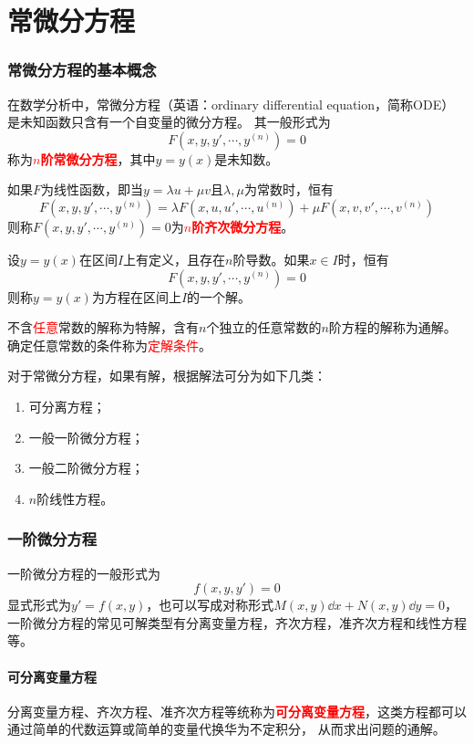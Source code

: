 \part{常微分方程}

\section{常微分方程的基本概念}
在数学分析中，常微分方程（英语：ordinary differential equation，简称ODE）是未知函数只含有一个自变量的微分方程。
其一般形式为
\begin{equation}
    F\left(x,y,y',\cdots,y^{(n)}\right) = 0
\end{equation}
称为\textcolor{red}{\textbf{\textsf{$n$阶常微分方程}}}，其中$y=y(x)$是未知数。

如果$F$为线性函数，即当$y=\lambda u + \mu v$且$\lambda,\mu$为常数时，恒有
\[ F\left(x,y,y',\cdots,y^{(n)}\right) = \lambda F\left(x, u, u', \cdots, u^{(n)}\right) + \mu F\left(x, v, v', \cdots, v^{(n)}\right) \]
则称$F\left(x,y,y',\cdots,y^{(n)}\right)=0$为\textcolor{red}{\textbf{\textsf{$n$阶齐次微分方程}}}。

\begin{definition}
    设$y=y(x)$在区间$I$上有定义，且存在$n$阶导数。如果$x\in I$时，恒有
    \[ F\left(x,y,y',\cdots,y^{(n)}\right) = 0 \]
    则称$y=y(x)$为方程在区间上$I$的一个解。
\end{definition}

不含\textcolor{red}{任意}常数的解称为特解，含有$n$个独立的任意常数的$n$阶方程的解称为通解。
确定任意常数的条件称为\textcolor{red}{定解条件}。

对于常微分方程，如果有解，根据解法可分为如下几类：
\begin{enumerate}
    \item 可分离方程；
    \item 一般一阶微分方程；
    \item 一般二阶微分方程；
    \item $n$阶线性方程。
\end{enumerate}

\section{一阶微分方程}
一阶微分方程的一般形式为
\[ f(x,y,y')=0 \]
显式形式为$y'=f(x,y)$，也可以写成对称形式$M(x,y)\dd{x}+N(x,y)\dd{y}=0$，一阶微分方程的常见可解类型有分离变量方程，齐次方程，准齐次方程和线性方程等。

\subsection{可分离变量方程}
分离变量方程、齐次方程、准齐次方程等统称为\textcolor{red}{\textbf{\textsf{可分离变量方程}}}，这类方程都可以通过简单的代数运算或简单的变量代换华为不定积分，
从而求出问题的通解。
